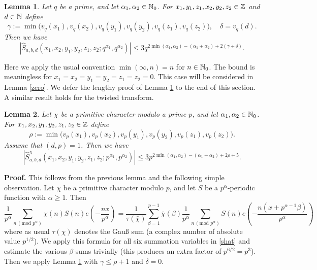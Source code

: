 \documentclass[11pt]{amsart}
\theoremstyle{plain}
\newtheorem{lemma}{Lemma}
\numberwithin{equation}{section}
\theoremstyle{definition}
\renewcommand{\geq}{\geqslant}
\renewcommand{\leq}{\leqslant}
\begin{document}
\begin{lemma}\label{peter1} Let  $q$ be a prime, and let $\alpha_1, \alpha_2 \in \Bbb{N}_0$.  For $x_1, y_1, z_1, x_2, y_2, z_2\in \Bbb{Z}$ and $d \in \Bbb{N}$  define $$\gamma := \min\bigl(v_q(x_1), v_q(x_2), v_q(y_1), v_q(y_2), v_q(z_1), v_q(z_2)\bigr), \quad \delta = v_q(d).$$
Then
 we have
$$|\widehat{S}_{a, b, d}(x_1, x_2, y_1, y_2, z_1, z_2; q^{\alpha_1}, q^{\alpha_2})| \leq 3q^{2\min(\alpha_1, \alpha_2)  -  (\alpha_1 + \alpha_2) + 2(\gamma + \delta)}.$$
\end{lemma}  

Here we apply the usual convention $\min(\infty, n) = n$ for $n \in \Bbb{N}_0$. The bound is meaningless for $x_1 = x_2 = y_1 = y_2 = z_1 = z_2 = 0$. This case will be considered in Lemma \ref{zero}. 
We defer the lengthy proof of Lemma \ref{peter1} to the end of this section.   A similar result holds for the twisted transform.

\begin{lemma}\label{twist} Let $\chi$ be a primitive character modulo a prime $p$,   and let $\alpha_1, \alpha_2 \in \Bbb{N}_0$.  For $x_1, x_2, y_1, y_2, z_1, z_2 \in \Bbb{Z}$   define $$\rho := \min\bigl(v_p(x_1), v_p(x_2), v_p(y_1), v_p(y_2), v_p(z_1), v_p(z_2)\bigr).$$  
Assume that $(d, p) = 1$. Then
 we have
$$|\widehat{S}^{\chi}_{a, b, d}(x_1, x_2, y_1, y_2, z_1, z_2; p^{\alpha_1}, p^{\alpha_2})| \leq  3p^{2\min(\alpha_1, \alpha_2)  -  (\alpha_1 + \alpha_2) + 2\rho + 5}.$$
 \end{lemma}  

\textbf{Proof.} 
This follows from the previous lemma  and  the following simple observation. Let $\chi$ be a primitive character modulo $p$, and let $S$ be a $p^{\alpha}$-periodic function with $\alpha \geq 1$. Then
\begin{equation}\label{chartwist}
\frac{1}{p^{\alpha}} \sum_{n \, (\text{mod } p^{\alpha}) } \chi(n) S(n) e\left(-\frac{nx}{p^{\alpha}}\right) = \frac{1}{\tau(\bar{\chi})} \sum_{\beta = 1}^{p-1} \bar{\chi}(\beta) \frac{1}{p^{\alpha}} \sum_{n \, (\text{mod } p^{\alpha}) } S(n) e\left(-\frac{n(x + p^{\alpha-1}\beta)}{p^{\alpha}}\right)
\end{equation}
where as usual $\tau(\chi)$ denotes the Gau{\ss} sum (a complex number of absolute value $p^{1/2}$). We apply this formula   for all six summation  variables in \eqref{shat} and estimate the various $\beta$-sums trivially (this produces an extra factor of $p^{ 6/2} = p^3$). Then we apply Lemma \ref{peter1} with $\gamma \leq \rho + 1$ and $\delta = 0$. 
   
\end{document}

